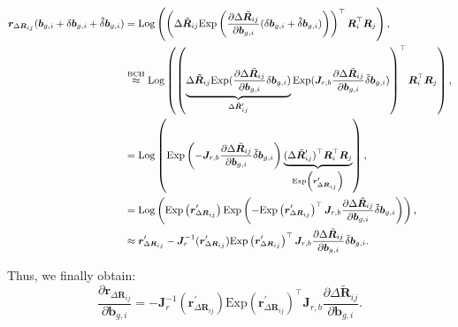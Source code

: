 \begin{equation}\label{key}
	\small
	\begin{aligned}
		\bm{r}_{\Delta \bm{R}_{ij}} (\bm{b}_{g,i} + \delta \bm{b}_{g,i} + \tilde{\delta} \bm{b}_{g,i}) &= 
		\mathrm{Log}\left( \left( \Delta \tilde{\bm{R}}_{ij} \mathrm{Exp} \left( \frac{\partial \Delta 
			\tilde{\bm{R}}_{ij}}{\partial \bm{b}_{g,i}} (\delta \bm{b}_{g,i} + \tilde{\delta} \bm{b}_{g,i}) \right) 
		\right)^\top \bm{R}_i^\top \bm{R}_j \right), \\
		&\buildrel\text{BCH}\over\approx \mathrm{Log} \left( \left( \underbrace{\Delta \tilde{\bm{R}}_{ij} 
			\mathrm{Exp} (\frac{\partial \Delta \tilde{\bm{R}}_{ij}}{\partial \bm{b}_{g,i}} \delta 
			\bm{b}_{g,i})}_{\Delta \tilde{\bm{R}}_{ij}^\prime} \mathrm{Exp} (\bm{J}_{r, b} \frac{\partial \Delta 
			\tilde{\bm{R}}_{ij}}{\partial \bm{b}_{g,i}} \tilde{\delta} \bm{b}_{g,i}) \right)^\top 
		\bm{R}_i^\top \bm{R}_j \right), \\
		&= \mathrm{Log} \left( \mathrm{Exp} \left(-\bm{J}_{r,b} \frac{\partial \Delta 
			\tilde{\bm{R}}_{ij}}{\partial \bm{b}_{g,i}} \tilde{\delta} \bm{b}_{g,i} \right) \underbrace{(\Delta 
			\tilde{\bm{R}}_{ij}^\prime)^\top \bm{R}_i^\top \bm{R}_j}_{ \mathrm{Exp} \left( 
			\bm{r}_{ \Delta \bm{R}_{ij}}^\prime \right)} \right), \\
		&= \mathrm{Log} \left( \mathrm{Exp} \left(\bm{r}_{\Delta \bm{R}_{ij}}^\prime \right) \mathrm{Exp} 
		\left( - \mathrm{Exp}\left(\bm{r}_{\Delta \bm{R}_{ij}}^\prime \right)^\top \bm{J}_{r,b} 
		\frac{\partial \Delta \tilde{\bm{R}}_{ij}}{\partial \bm{b}_{g,i}} \tilde{\delta} \bm{b}_{g,i} \right)  \right), \\
		&\approx \bm{r}_{\Delta \bm{R}_{ij}}^\prime - \bm{J}_r^{-1} (\bm{r}_{\Delta \bm{R}_{ij}}^\prime ) 
		\mathrm{Exp}\left(\bm{r}_{\Delta \bm{R}_{ij}}^\prime \right)^\top \bm{J}_{r,b} \frac{\partial 
			\Delta \tilde{\bm{R}}_{ij}}{\partial \bm{b}_{g,i}} \tilde{\delta} \bm{b}_{g,i} .
	\end{aligned}
\end{equation}

Thus, we finally obtain:
\begin{equation}\label{key}
	\frac{\partial \bm{r}_{\Delta \bm{R}_{ij}}}{\partial \bm{b}_{g,i}} = - \bm{J}_r^{-1} (\bm{r}_{\Delta 
		\bm{R}_{ij}}^\prime ) \mathrm{Exp}\left(\bm{r}_{\Delta \bm{R}_{ij}}^\prime \right)^\top 
	\bm{J}_{r,b} \frac{\partial \Delta \tilde{\bm{R}}_{ij}}{\partial \bm{b}_{g,i}}.
\end{equation}

